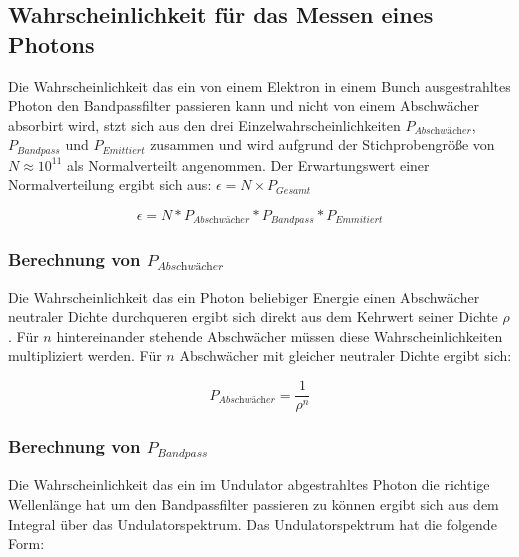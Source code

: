 \subsection{Wahrscheinlichkeit für das Messen eines Photons}
\label{sec:Wahrscheinlichkeitsrechnung}
Die Wahrscheinlichkeit das ein von einem Elektron in einem Bunch ausgestrahltes Photon
den Bandpassfilter passieren kann und nicht von einem Abschwächer absorbirt wird,
stzt sich aus den drei Einzelwahrscheinlichkeiten $P_{\textit{Abschwächer}}$,$P_{Bandpass}$ und $P_{𝐸𝑚𝑖𝑡𝑡𝑖𝑒𝑟𝑡}$
zusammen und wird aufgrund der Stichprobengröße von $N \approx 10^{11}$ als Normalverteilt
angenommen. Der Erwartungswert einer Normalverteilung ergibt sich aus: $\epsilon = N \times P_{Gesamt}$

\begin{equation*}
    \epsilon = N * P_{\textit{Abschwächer}} * P_{Bandpass} * P_{Emmitiert}
\end{equation*}

\subsubsection{Berechnung von \texorpdfstring{$P_{\textit{Abschwächer}}$}{TEXT}}
\label{sec:PAbschwaecher}
Die Wahrscheinlichkeit das ein Photon beliebiger Energie einen Abschwächer neutraler
Dichte durchqueren ergibt sich direkt aus dem Kehrwert seiner Dichte $\rho$. Für $n$ hintereinander stehende 
Abschwächer müssen diese Wahrscheinlichkeiten multipliziert werden. Für $n$ Abschwächer mit gleicher 
neutraler Dichte ergibt sich:

\begin{equation*}
    P_{\textit{Abschwächer}} = \frac{1}{\rho^n}
\end{equation*}

\subsubsection{Berechnung von \texorpdfstring{$P_{Bandpass}$}{TEXT}}
\label{sec:PBandpass}
Die Wahrscheinlichkeit das ein im Undulator abgestrahltes Photon die richtige Wellenlänge hat um den 
Bandpassfilter passieren zu können ergibt sich aus dem Integral über das Undulatorspektrum. Das 
Undulatorspektrum hat die folgende Form:




